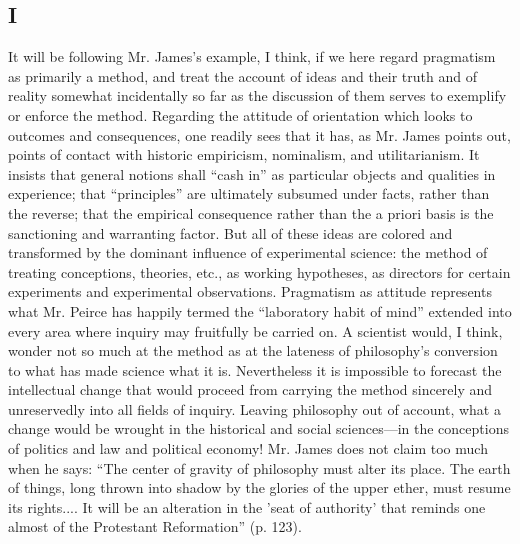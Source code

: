 \documentclass[12pt]{article}
\begin{document}
\subsection*{I}
It will be following Mr. James's example, I think, if we here regard
pragmatism as primarily a method, and treat the account of ideas and
their truth and of reality somewhat incidentally so far as the
discussion of them serves to exemplify or enforce the method.
Regarding the attitude of orientation which looks to outcomes and
consequences, one readily sees that it has, as Mr. James points out,
points of contact with historic empiricism, nominalism, and
utilitarianism. It insists that general notions shall ``cash in'' as
particular objects and qualities in experience; that ``principles'' are
ultimately subsumed under facts, rather than the reverse; that the
empirical consequence rather than the a priori basis is the
sanctioning and warranting factor. But all of these ideas are colored
and transformed by the dominant influence of experimental science: the
method of treating conceptions, theories, etc., as working hypotheses,
as
directors for certain experiments and experimental observations.
Pragmatism as attitude represents what Mr. Peirce has happily termed
the ``laboratory habit of mind'' extended into every area where inquiry
may fruitfully be carried on. A scientist would, I think, wonder not
so much at the method as at the lateness of philosophy's conversion to
what has made science what it is. Nevertheless it is impossible to
forecast the intellectual change that would proceed from carrying the
method sincerely and unreservedly into all fields of inquiry. Leaving
philosophy out of account, what a change would be wrought in the
historical and social sciences---in the conceptions of politics and law
and political economy! Mr. James does not claim too much when he says:
``The center of gravity of philosophy must alter its place. The earth
of things, long thrown into shadow by the glories of the upper ether,
must resume its rights.... It will be an alteration in the 'seat of
authority' that reminds one almost of the Protestant Reformation'' (p.
123).
\end{document}

